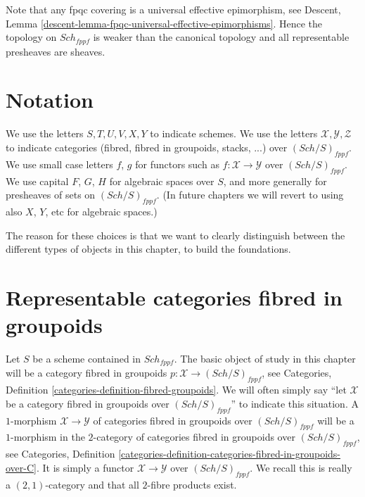 \documentclass{stacks-project}
\theoremstyle{plain}
\theoremstyle{definition}
\theoremstyle{remark}
\numberwithin{equation}{subsection}
\def\Sch{\mathit{Sch}}
\begin{document}
\medskip\noindent
Note that any fpqc covering is a universal effective
epimorphism, see
Descent, Lemma \ref{descent-lemma-fpqc-universal-effective-epimorphisms}.
Hence the topology on $\Sch_{fppf}$
is weaker than the canonical topology and all representable presheaves
are sheaves.








\section{Notation}
\label{section-notation}

\noindent
We use the letters $S, T, U, V, X, Y$ to indicate schemes.
We use the letters $\mathcal{X}, \mathcal{Y}, \mathcal{Z}$ to indicate
categories (fibred, fibred in groupoids, stacks, ...)
over $(\Sch/S)_{fppf}$. We use small case letters
$f$, $g$ for functors such as $f : \mathcal{X} \to \mathcal{Y}$
over $(\Sch/S)_{fppf}$.
We use capital $F$, $G$, $H$ for algebraic spaces over $S$, and more
generally for presheaves of sets on $(\Sch/S)_{fppf}$.
(In future chapters we will revert to using also $X$, $Y$, etc
for algebraic spaces.)

\medskip\noindent
The reason for these choices is that we want to clearly distinguish between
the different types of objects in this chapter, to build the foundations.









\section{Representable categories fibred in groupoids}
\label{section-representable}

\noindent
Let $S$ be a scheme contained in $\Sch_{fppf}$.
The basic object of study in this chapter will be a
category fibred in groupoids
$p : \mathcal{X} \to (\Sch/S)_{fppf}$, see
Categories, Definition \ref{categories-definition-fibred-groupoids}.
We will often simply say ``let $\mathcal{X}$ be a category fibred
in groupoids over $(\Sch/S)_{fppf}$'' to indicate
this situation. A $1$-morphism $\mathcal{X} \to \mathcal{Y}$ of categories
fibred in groupoids over $(\Sch/S)_{fppf}$ will be a $1$-morphism
in the $2$-category of categories fibred in groupoids over
$(\Sch/S)_{fppf}$, see
Categories,
Definition \ref{categories-definition-categories-fibred-in-groupoids-over-C}.
It is simply a functor $\mathcal{X} \to \mathcal{Y}$ over
$(\Sch/S)_{fppf}$.
We recall this is really a $(2, 1)$-category and that all $2$-fibre products
exist.
\end{document}
